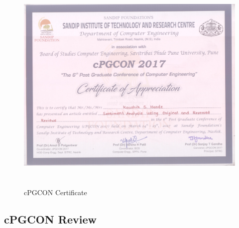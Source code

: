 \documentclass[oneside,a4paper,12pt]{pictreport}
\begin{document}
\begin{figure}[!h]
\includegraphics[width=5.5in,height=4.2in]{6107_certificate.jpg}
\caption{cPGCON Certificate}
\end{figure}

\newpage
\subsection{cPGCON Review}
\end{document}
